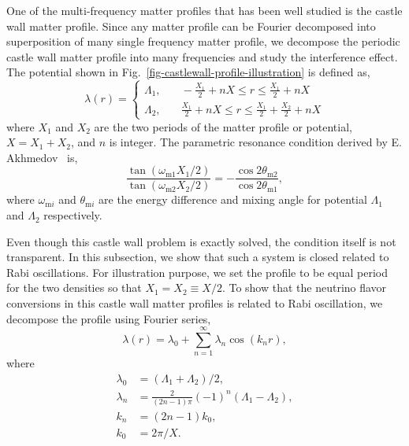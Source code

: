 \documentclass[%
reprint,
 amsmath,amssymb,
 prd,
]{revtex4-1}
\begin{document}
One of the multi-frequency matter profiles that has been well studied is the castle wall matter profile. Since any matter profile can be Fourier decomposed into superposition of many single frequency matter profile, we decompose the periodic castle wall matter profile into many frequencies and study the interference effect. The potential shown in Fig.~\ref{fig-castlewall-profile-illustration} is defined as,
\begin{equation}
    \lambda(r) = \begin{cases} 
\Lambda_1, &\quad -\frac{X_1}{2}+nX\le r\le \frac{X_1}{2}+nX \\
\Lambda_2, &\quad \frac{X_1}{2}+nX\le r\le \frac{X_1}{2}+\frac{X_2}{2} +nX
\end{cases}
\label{eq-castle-wall-potential}
\end{equation}
where $X_1$ and $X_2$ are the two periods of the matter profile or potential, $X=X_1+X_2$, and $n$ is integer. The parametric resonance condition derived by E. Akhmedov~\cite{Akhmedov2000} is,
\begin{equation}
    \frac{\tan (\omega_{\mathrm m1}X_1/2)}{\tan (\omega_{\mathrm m2}X_2/2)} = - \frac{\cos 2\theta_{\mathrm m2}}{\cos 2\theta_{\mathrm m1}},
\end{equation}
where $\omega_{\mathrm{m}i}$ and $\theta_{\mathrm{m}i}$ are the energy difference and mixing angle for potential $\Lambda_1$ and $\Lambda_2$ respectively.



Even though this castle wall problem is exactly solved, the condition itself is not transparent. In this subsection, we show that such a system is closed related to Rabi oscillations. For illustration purpose, we set the profile to be equal period for the two densities so that $X_1=X_2\equiv X/2$. To show that the neutrino flavor conversions in this castle wall matter profiles is related to Rabi oscillation, we decompose the profile using Fourier series,
\begin{equation}
\lambda(r) = \lambda_0 + \sum_{n=1}^{\infty} \lambda_n \cos\left( k_n  r \right),
\label{eq-castle-wall-fourier-expanded}
\end{equation}
where 
\begin{align*}
\lambda_0 &= (\Lambda_1 + \Lambda_2)/2, \\
\lambda_n & = \frac{2}{(2n-1)\pi}  (-1)^n  \left( \Lambda_1 -  \Lambda_2 \right),\\
k_n &= (2n-1)k_0, \\
k_0 &= 2\pi/X.
\end{align*}
\end{document}
